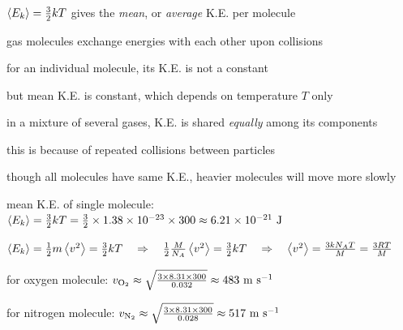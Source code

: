 \cmt $\left< E_k \right> = \frac{3}{2}k T$ gives the \emph{mean}, or \emph{average} K.E. per molecule

gas molecules exchange energies with each other upon collisions

for an individual molecule, its K.E. is not a constant

but mean K.E. is constant, which depends on temperature $T$ only

\cmt in a mixture of several gases, K.E. is shared \emph{equally} among its components

this is because of repeated collisions between particles

though all molecules have same K.E., heavier molecules will move more slowly





\begin{soln} mean K.E. of single molecule: $\left< E_k \right> = \frac{3}{2}kT = \frac{3}{2} \times 1.38\times10^{-23} \times 300 \approx 6.21\times 10^{-21} \text{ J}$

{
	
	\centering
	
	$\left< E_k \right> = \frac{1}{2}m\left< v^2 \right> = \frac{3}{2} kT \quad \Rightarrow \quad \frac{1}{2} \frac{M}{N_A} \left< v^2 \right> = \frac{3}{2} kT \quad \Rightarrow \quad \left< v^2 \right> = \frac{3kN_AT}{M} = \frac{3RT}{M}$
	
}

\eqyskip

for oxygen molecule: $v_\text{O$_2$} \approx  \sqrt{\frac{3\times8.31\times300}{0.032}} \approx 483 \text{ m s$^{-1}$}$

\eqyskip

for nitrogen molecule: $v_\text{N$_2$} \approx  \sqrt{\frac{3\times8.31\times300}{0.028}} \approx 517 \text{ m s$^{-1}$}$ \end{soln}


